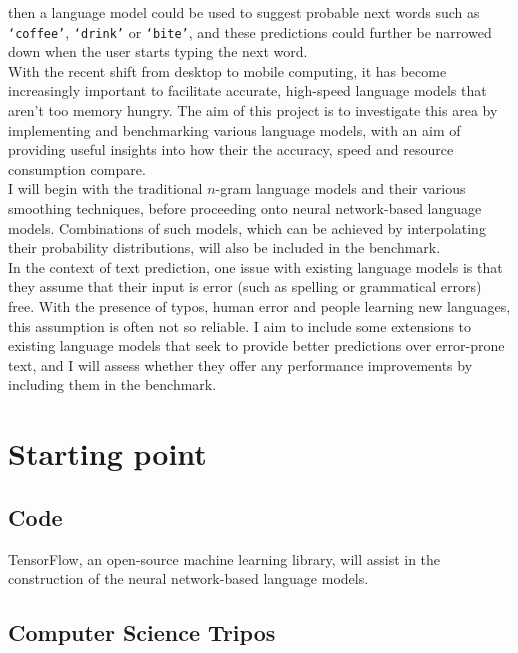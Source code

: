 \documentclass[a4paper, 12pt]{article}
\newcommand{\ttt}[1]{\texttt{#1}}
\begin{document}
then a language model could be used to suggest probable next words such as \ttt{`coffee'}, \ttt{`drink'} or \ttt{`bite'}, and these predictions could further be narrowed down when the user starts typing the next word. \\

With the recent shift from desktop to mobile computing, it has become increasingly important to facilitate accurate, high-speed language models that aren't too memory hungry. The aim of this project is to investigate this area by implementing and benchmarking various language models, with an aim of providing useful insights into how their the accuracy, speed and resource consumption compare. \\

I will begin with the traditional $n$-gram language models and their various smoothing techniques, before proceeding onto neural network-based language models. Combinations of such models, which can be achieved by interpolating their probability distributions, will also be included in the benchmark. \\

In the context of text prediction, one issue with existing language models is that they assume that their input is error (such as spelling or grammatical errors) free. With the presence of typos, human error and people learning new languages, this assumption is often not so reliable. I aim to include some extensions to existing language models that seek to provide better predictions over error-prone text, and I will assess whether they offer any performance improvements by including them in the benchmark.

\section*{Starting point}

\subsection*{Code}
TensorFlow, an open-source machine learning library, will assist in the construction of the neural network-based language models.

\subsection*{Computer Science Tripos}
\end{document}
